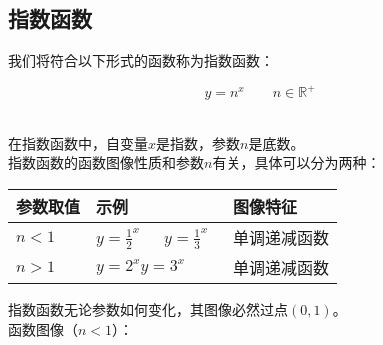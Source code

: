 \documentclass[UTF8]{ctexart}
\begin{document}
\subsection{指数函数}
    我们将符合以下形式的函数称为指数函数：
    \begin{large}
        \begin{equation*}
            y=n^x\qquad n\in\mathbb{R^+}
        \end{equation*}
    \end{large}\\
    在指数函数中，自变量$x$是指数，参数$n$是底数。\\[3mm]
    指数函数的函数图像性质和参数$n$有关，具体可以分为两种：\vspace{5pt}
    \begin{center}
        \begin{tabular}{l|l|l}
            \hline
            参数取值&示例&图像特征\\ \hline
            $n<1$\qquad\qquad&$y=\frac{1}{2}^x$\quad~~~$y=\frac{1}{3}^x$&单调递减函数\qquad\qquad\\ \hline
            $n>1$\qquad\qquad&$y=2^x$\qquad$y=3^x\qquad$&单调递减函数\\ \hline
        \end{tabular}
    \end{center}
    \vspace{10pt}
    指数函数无论参数如何变化，其图像必然过点$(0,1)$。\\[3mm]
    函数图像（$n<1$）：
\end{document}
